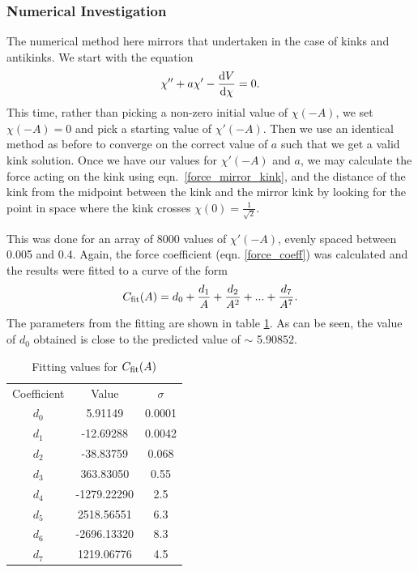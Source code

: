 \documentclass[11pt, oneside]{article}  	%
\numberwithin{equation}{section}
\newcommand{\drv}{\ensuremath{\textup{d}}}
\begin{document}
\subsubsection{Numerical Investigation}
The numerical method here mirrors that undertaken in the case of kinks and antikinks. We start with the equation
\begin{equation}
\chi'' + a\chi' - \frac{\drv V }{\drv \chi}=0.
\end{equation}
This time, rather than picking a non-zero initial value of $\chi(-A)$, we set $\chi(-A) = 0$ and pick a starting value of $\chi'(-A)$. Then we use an identical method as before to converge on the correct value of $a$ such that we get a valid kink solution. Once we have our values for $\chi'(-A)$ and $a$, we may calculate the force acting on the kink using eqn.~\ref{force_mirror_kink}, and the distance of the kink from the midpoint between the kink and the mirror kink by looking for the point in space where the kink crosses $\chi(0) = \frac{1}{\sqrt{2}}$.\par
This was done for an array of 8000 values of $\chi'(-A)$, evenly spaced between 0.005 and 0.4. Again, the force coefficient (eqn. \ref{force_coeff}) was calculated and the results were fitted to a curve of the form
\begin{align}
C_{\textup{fit}}(A) = d_0 + \frac{d_1}{A} + \frac{d_2}{A^2} + ... + \frac{d_7}{A^7}.
\end{align}
The parameters from the fitting are shown in table \ref{kmk_manton_table}. As can be seen, the value of $d_0$ obtained is close to the predicted value of $\sim$ 5.90852.\par
\begin{table}[ht]
    \begin{center}
    \caption{Fitting values for $C_{\textup{fit}}(A)$}
        \begin{tabular}{|c|c|c|}\label{kmk_manton_table}
        Coefficient & Value & $\sigma$\\
        $d_ 0 $ &  5.91149  &  0.0001\\
        $d_ 1 $ &  -12.69288  &  0.0042\\
        $d_ 2 $ &  -38.83759  &  0.068\\
        $d_ 3 $ &  363.83050  &  0.55\\
        $d_ 4 $ &  -1279.22290  &  2.5\\
        $d_ 5 $ &  2518.56551  &  6.3\\
        $d_ 6 $ &  -2696.13320  &  8.3\\
        $d_ 7 $ &  1219.06776  &  4.5\\
        \end{tabular}
    \end{center}
\end{table}
\end{document}
